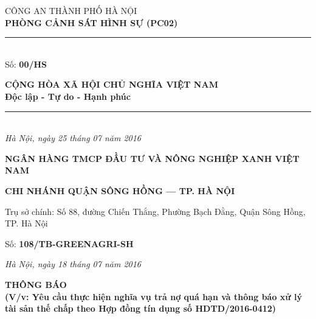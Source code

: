\documentclass[12pt,a4paper]{article}
\begin{document}
\noindent
\begin{minipage}[t]{0.46\textwidth}
    \begin{center}
        \fontsize{11pt}{13pt}\selectfont
        CÔNG AN THÀNH PHỐ HÀ NỘI\\
        \textbf{PHÒNG CẢNH SÁT HÌNH SỰ (PC02)}\\[-0.2em]
        \rule{3.2cm}{0.6pt}\\[0.25cm]
        \fontsize{11pt}{13pt}\selectfont Số: \textbf{00/HS}
    \end{center}
\end{minipage}
\hfill
\begin{minipage}[t]{0.52\textwidth}
    \begin{center}
        \fontsize{11pt}{13pt}\selectfont
        \textbf{CỘNG HÒA XÃ HỘI CHỦ NGHĨA VIỆT NAM}\\
        \textbf{Độc lập - Tự do - Hạnh phúc}\\[-0.2em]
        \rule{3.6cm}{0.6pt}\\[0.25cm]
        \textit{Hà Nội, ngày 25 tháng 07 năm 2016}
    \end{center}
\end{minipage}

\vspace{0.5cm}

\begin{center}
    \textbf{\Large NGÂN HÀNG TMCP ĐẦU TƯ VÀ NÔNG NGHIỆP XANH VIỆT NAM}\\[0.15cm]
    \textit{}
\end{center}

\vspace{0.3cm}
\textbf{CHI NHÁNH QUẬN SÔNG HỒNG — TP. HÀ NỘI}

Trụ sở chính: Số 88, đường Chiến Thắng, Phường Bạch Đằng, Quận Sông Hồng, TP. Hà Nội

Số: \textbf{108/TB-GREENAGRI-SH}




\textit{Hà Nội, ngày 18 tháng 07 năm 2016}




\vspace{0.4cm}\noindent\textbf{\large THÔNG BÁO}\\[0.2cm]


\vspace{0.3cm}\noindent\textbf{\large (V/v: Yêu cầu thực hiện nghĩa vụ trả nợ quá hạn và thông báo xử lý tài sản thế chấp theo Hợp đồng tín dụng số HDTD/2016-0412)}\\[0.15cm]
\end{document}

